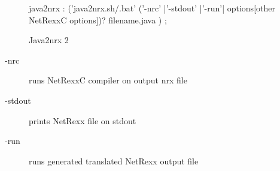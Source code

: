 \begin{figure}[h]
\caption{Java2nrx 2}
\begin{rail}
java2nrx : ('java2nrx.sh/.bat' 
                 ('-nrc' |'-stdout' |'-run'| options[other NetRexxC options])? filename.java 
                )
               ;
\end{rail}
\end{figure}
\begin{description}
   \item[-nrc]      runs NetRexxC compiler on output nrx file
   \item[-stdout]   prints NetRexx file on stdout
   \item[-run]      runs generated translated NetRexx output file
\end{description}
